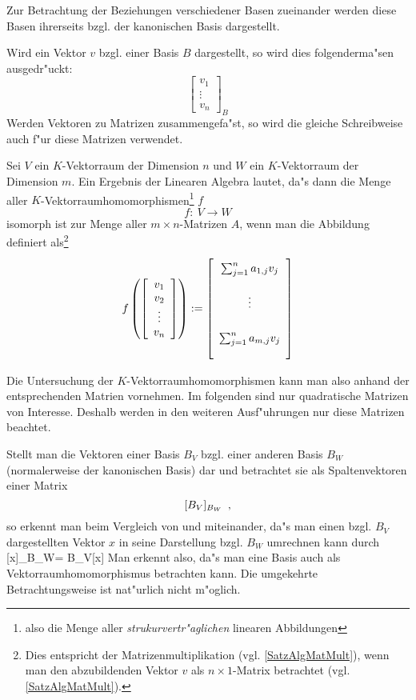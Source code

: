 Zur Betrachtung der Beziehungen verschiedener Basen zueinander werden diese
Basen ihrerseits bzgl. der kanonischen Basis dargestellt. 

Wird ein Vektor $v$ bzgl. einer Basis $B$ dargestellt, so wird dies
folgenderma"sen ausgedr"uckt:
\[ \left[
       \begin{array}{c}
           v_1 \\ \vdots \\ v_n
       \end{array}
   \right]_B
\]
Werden Vektoren zu Matrizen zusammengefa"st, so wird die gleiche 
Schreibweise auch f"ur diese Matrizen verwendet.

Sei $V$ ein $K$-Vektorraum der Dimension $n$ und $W$ ein $K$-Vektorraum
der Dimension $m$. Ein Ergebnis der Linearen Algebra lautet, da"s dann
die Menge aller $K$-Vektorraumhomomorphismen\footnote{also die Menge
aller {\em strukurvertr"aglichen} linearen Abbildungen} $f$
\[ f : \: V \rightarrow W \]
isomorph ist zur Menge aller $m \times n$-Matrizen $A$, wenn man die 
Abbildung definiert als\footnote{Dies entspricht der 
Matrizenmultiplikation (vgl. \ref{SatzAlgMatMult}), wenn man den 
abzubildenden Vektor $v$ als $n \times 1$-Matrix 
betrachtet (vgl. \ref{SatzAlgMatMult}).}
\[ f \lb
         \left[
             \begin{array}{c} v_1\\ v_2\\ \vdots\\ v_n \end{array}
         \right]
     \rb
   :=
      \left[
          \begin{array}{c}
              \sum_{j=1}^n a_{1,j} v_j \LMatStrut \\
              \vdots \LMatStrut                   \\
              \sum_{j=1}^n a_{m,j} v_j \LMatStrut
          \end{array}
      \right]
\]

Die Untersuchung der $K$-Vektorraumhomomorphismen kann man
also anhand der entsprechenden Matrien vornehmen. Im folgenden 
sind nur quadratische Matrizen von Interesse. Deshalb werden in den 
weiteren Ausf"uhrungen nur diese Matrizen beachtet.

Stellt man die Vektoren einer Basis $B_V$ bzgl. einer anderen Basis $B_W$
(normalerweise der kanonischen Basis) dar und betrachtet sie als
Spaltenvektoren einer Matrix \[ [B_V]_{B_W} \mbox{\hspace{0.5em},} \]
so erkennt man beim Vergleich von
 und  miteinander,
da"s man einen bzgl. $B_V$ dargestellten Vektor $x$ in seine Darstellung
bzgl. $B_W$ umrechnen kann durch
    [x]_{B_W}= B_V[x] \MyPunkt
\Eeq
Man erkennt also, da"s man eine Basis auch als Vektorraumhomomorphismus
betrachten kann. Die umgekehrte Betrachtungsweise ist nat"urlich nicht
m"oglich.

